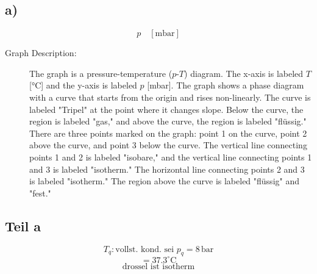 

\subsection*{a)}

\[
p \quad [\text{mbar}]
\]

\begin{description}
    \item[Graph Description:] The graph is a pressure-temperature ($p$-$T$) diagram. The x-axis is labeled $T$ [°C] and the y-axis is labeled $p$ [mbar]. The graph shows a phase diagram with a curve that starts from the origin and rises non-linearly. The curve is labeled "Tripel" at the point where it changes slope. Below the curve, the region is labeled "gas," and above the curve, the region is labeled "flüssig." There are three points marked on the graph: point 1 on the curve, point 2 above the curve, and point 3 below the curve. The vertical line connecting points 1 and 2 is labeled "isobare," and the vertical line connecting points 1 and 3 is labeled "isotherm." The horizontal line connecting points 2 and 3 is labeled "isotherm." The region above the curve is labeled "flüssig" and "fest."
\end{description}

\subsection*{Teil a}
\[
T_q: \text{vollst. kond. sei } p_q = 8 \, \text{bar}
\]
\[
= 37.3^\circ \text{C}
\]
\[
\text{drossel ist isotherm}
\]